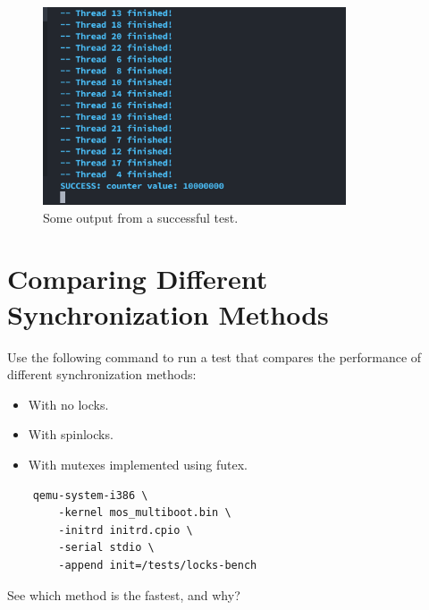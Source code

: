 \begin{figure}[h]
    \centering
    \includegraphics[width=0.8\textwidth]{assets/c3.futex-output.png}
    \caption{Some output from a successful test.}
\end{figure}

\section{Comparing Different Synchronization Methods}

Use the following command to run a test that compares the performance of different
synchronization methods:

\begin{itemize}
    \item With no locks.
    \item With spinlocks.
    \item With mutexes implemented using futex.
\end{itemize}

\begin{verbatim}
    qemu-system-i386 \
        -kernel mos_multiboot.bin \
        -initrd initrd.cpio \
        -serial stdio \
        -append init=/tests/locks-bench
\end{verbatim}

See which method is the fastest, and why?
